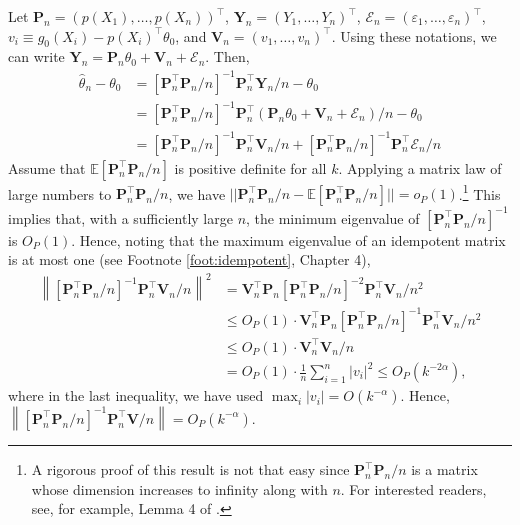 \documentclass[10.5pt, A4paper, openany, uplatex]{book}
\newcommand{\mbf}{\mathbf}
\newcommand{\mcl}{\mathcal}
\newcommand{\eps}{\varepsilon}
\newcommand{\E}{\mathbb{E}}
\renewcommand{\hat}{\widehat}
\numberwithin{equation}{section}
\begin{document}
Let $\mbf{P}_n = (p(X_1), \ldots, p(X_n))^\top$, $\mbf{Y}_n = (Y_1, \ldots, Y_n)^\top$, $\mcl{E}_n = (\eps_1, \ldots, \eps_n)^\top$, $v_i \equiv g_0(X_i) - p(X_i)^\top \theta_0$, and $\mbf{V}_n = (v_1, \ldots , v_n)^\top$.
Using these notations, we can write $\mbf{Y}_n = \mbf{P}_n \theta_0 + \mbf{V}_n + \mcl{E}_n$.
Then,
\begin{align*}
	\hat \theta_n - \theta_0 
	& = \left[\mbf{P}_n^\top \mbf{P}_n /n \right]^{-1}\mbf{P}_n^\top \mbf{Y}_n /n - \theta_0 \\
	& = \left[\mbf{P}_n^\top \mbf{P}_n /n \right]^{-1}\mbf{P}_n^\top (\mbf{P}_n \theta_0 + \mbf{V}_n + \mcl{E}_n) /n - \theta_0 \\
	& = \left[\mbf{P}_n^\top \mbf{P}_n /n \right]^{-1}\mbf{P}_n^\top \mbf{V}_n /n + \left[\mbf{P}_n^\top \mbf{P}_n /n \right]^{-1}\mbf{P}_n^\top \mcl{E}_n /n 
\end{align*}
Assume that $\E[\mbf{P}_n^\top \mbf{P}_n /n]$ is positive definite for all $k$.
Applying a matrix law of large numbers to $\mbf{P}_n^\top \mbf{P}_n /n$, we have $||\mbf{P}_n^\top \mbf{P}_n /n - \E[\mbf{P}_n^\top \mbf{P}_n /n]|| = o_P(1)$.\footnote{
	A rigorous proof of this result is not that easy since $\mbf{P}_n^\top \mbf{P}_n /n$ is a matrix whose dimension increases to infinity along with $n$.
	For interested readers, see, for example, Lemma 4 of \cite{horowitz2004nonparametric}.
}
This implies that, with a sufficiently large $n$, the minimum eigenvalue of $\left[\mbf{P}_n^\top \mbf{P}_n /n \right]^{-1}$ is $O_P(1)$.
Hence, noting that the maximum eigenvalue of an idempotent matrix is at most one (see Footnote \ref{foot:idempotent}, Chapter 4),
\begin{align*}
	\left\|\left[\mbf{P}_n^\top \mbf{P}_n /n \right]^{-1}\mbf{P}_n^\top \mbf{V}_n /n \right\|^2 
	& = \mbf{V}_n^\top \mbf{P}_n \left[\mbf{P}_n^\top \mbf{P}_n /n \right]^{-2}\mbf{P}_n^\top \mbf{V}_n /n^2 \\
	& \le O_P(1) \cdot \mbf{V}_n^\top \mbf{P}_n \left[\mbf{P}_n^\top \mbf{P}_n /n \right]^{-1}\mbf{P}_n^\top \mbf{V}_n /n^2 \\
	& \le O_P(1) \cdot \mbf{V}_n^\top \mbf{V}_n /n \\
	& = O_P(1) \cdot \frac{1}{n}\sum_{i=1}^n |v_i|^2 \le O_P(k^{-2\alpha}),
\end{align*}
where in the last inequality, we have used $\max_i |v_i| = O(k^{-\alpha})$.
Hence, $\left\|\left[\mbf{P}_n^\top \mbf{P}_n /n \right]^{-1}\mbf{P}_n^\top \mbf{V} /n \right\| = O_P(k^{-\alpha})$.
\end{document}
